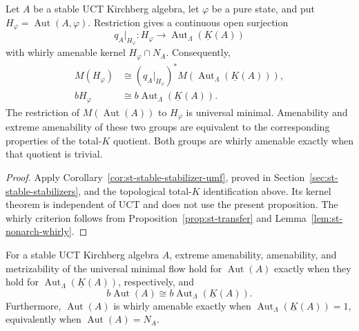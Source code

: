 \begin{proposition}\label{prop:st-pure-state-quotient}
 Let $A$ be a stable UCT Kirchberg algebra,
let $\varphi$ be a pure state, and put $H_\varphi=\operatorname{Aut}(A,\varphi)$.
Restriction gives a continuous open surjection 
\begin{equation*}
q_A|_{H_\varphi}:H_\varphi\longrightarrow  \operatorname{Aut}_\Lambda(\underline
K(A)) 
\end{equation*}
with whirly amenable kernel $H_\varphi\cap N_A$. Consequently,
\begin{equation*}
\begin{split}
M(H_\varphi)&\cong (q_A|_{H_\varphi})^*M(\operatorname{Aut}_\Lambda(\underline
K(A))), \\
bH_\varphi&\cong b\operatorname{Aut}_\Lambda(\underline K(A)).
\end{split}
\end{equation*}
The restriction of $M(\operatorname{Aut}(A))$ to $H_\varphi$ is universal minimal.
Amenability and extreme amenability of these two groups are equivalent to
the corresponding properties of the total-$K$ quotient.
Both groups are whirly amenable exactly when that quotient is trivial.
\end{proposition}

\begin{proof}
Apply Corollary~\ref{cor:st-stable-stabilizer-umf}, proved in Section~\ref{sec:st-stable-stabilizers}, and the topological total-$K$ identification
above. Its kernel theorem is independent of UCT and does not use the present
proposition.
The whirly criterion follows from Proposition~\ref{prop:st-transfer} and
Lemma~\ref{lem:st-nonarch-whirly}.
\end{proof}

\begin{corollary}\label{cor:st-aut-bohr}
For a stable UCT Kirchberg
algebra $A$, extreme amenability, amenability, and metrizability of the
universal minimal flow hold for $\operatorname{Aut}(A)$ exactly when they hold for
$\operatorname{Aut}_\Lambda(\underline K(A))$, respectively, and
\begin{equation*}
b\operatorname{Aut}(A)\cong b\operatorname{Aut}_\Lambda(\underline K(A)).
\end{equation*}
Furthermore, $\operatorname{Aut}(A)$ is whirly amenable exactly when
$\operatorname{Aut}_\Lambda(\underline K(A))=1$, equivalently when $\operatorname{Aut}(A)=N_A$.
\end{corollary}

